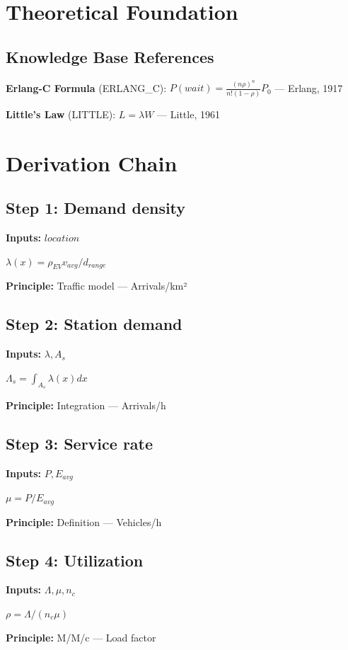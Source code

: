 \documentclass[11pt,twocolumn]{article}
\begin{document}
\section{Theoretical Foundation}

\subsection{Knowledge Base References}
\textbf{Erlang-C Formula} (ERLANG_C): $P(wait) = \frac{(n\rho)^n}{n!(1-\rho)}P_0$ --- Erlang, 1917

\textbf{Little's Law} (LITTLE): $L = \lambda W$ --- Little, 1961


\section{Derivation Chain}

\subsection*{Step 1: Demand density}
\textbf{Inputs:} $location$

$\lambda(x) = \rho_{EV} v_{avg} / d_{range}$

\textbf{Principle:} Traffic model --- Arrivals/km²

\subsection*{Step 2: Station demand}
\textbf{Inputs:} $\lambda, A_s$

$\Lambda_s = \int_{A_s} \lambda(x) dx$

\textbf{Principle:} Integration --- Arrivals/h

\subsection*{Step 3: Service rate}
\textbf{Inputs:} $P, E_{avg}$

$\mu = P / E_{avg}$

\textbf{Principle:} Definition --- Vehicles/h

\subsection*{Step 4: Utilization}
\textbf{Inputs:} $\Lambda, \mu, n_c$

$\rho = \Lambda / (n_c \mu)$

\textbf{Principle:} M/M/c --- Load factor
\end{document}
